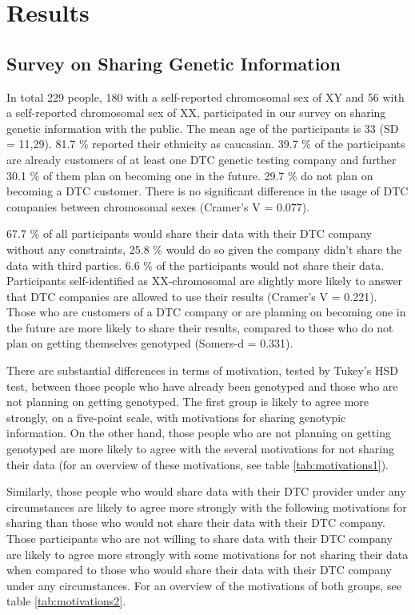 \documentclass[10pt]{article}
\begin{document}
\section*{Results}
\subsection*{Survey on Sharing Genetic Information}
In total 229 people, 180 with a self-reported chromosomal sex of XY and 56 with a self-reported chromosomal sex of XX, participated in our survey on sharing genetic information with the public. 
The mean age of the participants is 33 (SD = 11,29). 81.7 \% reported their ethnicity as caucasian. 39.7 \% of the participants are already 
customers of at least one DTC genetic testing company and further 30.1 \% of them plan on becoming one in the future. 29.7 \% do not plan on 
becoming a DTC customer. There is no significant difference in the usage of DTC companies between chromosomal sexes (Cramer's V = 0.077). 

67.7 \% of all participants would share their data with their DTC company without any constraints, 25.8 \% would do so given the company 
didn't share the data with third parties. 6.6 \% of the participants would not share their data. Participants self-identified as XX-chromosomal are slightly more likely to answer that DTC companies are allowed to use their results (Cramer's V = 0.221). Those who are customers of a DTC company or are planning on becoming one in 
the future are more likely to share their results, compared to those who do not plan on getting themselves genotyped (Somers-d = 0.331). 


There are substantial differences in terms of motivation, tested by Tukey's HSD test, between those people who have already been genotyped 
and those who are not planning on getting genotyped. The first group is likely to agree more strongly, on a five-point scale, with motivations for sharing genotypic information. On the other hand, those people who are not planning on getting genotyped are more likely to agree with the several motivations 
for not sharing their data (for an overview of these motivations, see table \ref{tab:motivations1}).

Similarly, those people who would share data with their DTC provider under any circumstances are likely to agree more strongly with 
the following motivations for sharing than those who would not share their data with their DTC company.
Those participants who are not willing to share data with their DTC company are likely to agree more strongly with some motivations 
for not sharing their data when compared to those who would share their data with their DTC company under any circumstances. For an overview of the motivations of both groups, see table \ref{tab:motivations2}.
\end{document}
